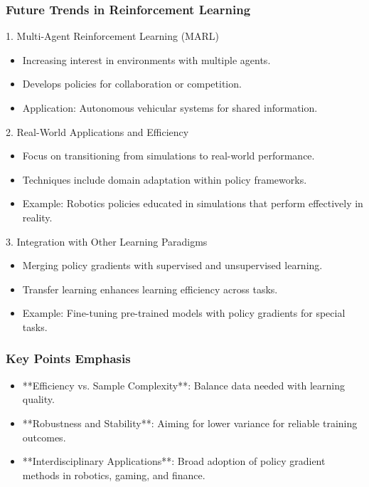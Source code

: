 \documentclass[aspectratio=169]{beamer}
\begin{document}
\begin{frame}[fragile]
  \frametitle{Future Trends in Reinforcement Learning}
  \begin{block}{1. Multi-Agent Reinforcement Learning (MARL)}
    \begin{itemize}
      \item Increasing interest in environments with multiple agents.
      \item Develops policies for collaboration or competition.
      \item Application: Autonomous vehicular systems for shared information.
    \end{itemize}
  \end{block}

  \begin{block}{2. Real-World Applications and Efficiency}
    \begin{itemize}
      \item Focus on transitioning from simulations to real-world performance.
      \item Techniques include domain adaptation within policy frameworks.
      \item Example: Robotics policies educated in simulations that perform effectively in reality.
    \end{itemize}
  \end{block}

  \begin{block}{3. Integration with Other Learning Paradigms}
    \begin{itemize}
      \item Merging policy gradients with supervised and unsupervised learning.
      \item Transfer learning enhances learning efficiency across tasks.
      \item Example: Fine-tuning pre-trained models with policy gradients for special tasks.
    \end{itemize}
  \end{block}
\end{frame}

\begin{frame}[fragile]
  \frametitle{Key Points Emphasis}
  \begin{itemize}
    \item **Efficiency vs. Sample Complexity**: Balance data needed with learning quality.
    \item **Robustness and Stability**: Aiming for lower variance for reliable training outcomes.
    \item **Interdisciplinary Applications**: Broad adoption of policy gradient methods in robotics, gaming, and finance.
  \end{itemize}
\end{frame}
\end{document}
